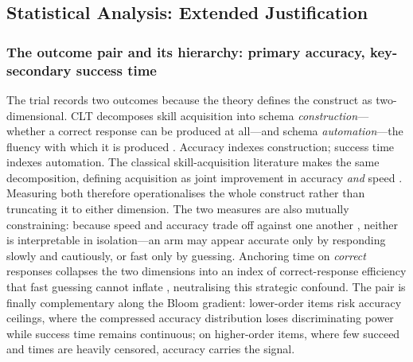 
\subsection{Statistical Analysis: Extended Justification}
\label{app:sap-extended}

\subsubsection{The outcome pair and its hierarchy: primary accuracy, key-secondary success time}
\label{app:coprimary-rationale}
The trial records two outcomes because the theory defines the construct as two-dimensional. CLT decomposes skill acquisition into schema \emph{construction}---whether a correct response can be produced at all---and schema \emph{automation}---the fluency with which it is produced \parencite{sweller1998,kalyuga2003}. Accuracy indexes construction; success time indexes automation. The classical skill-acquisition literature makes the same decomposition, defining acquisition as joint improvement in accuracy \emph{and} speed \parencite{proctor1995,fitts1967}. Measuring both therefore operationalises the whole construct rather than truncating it to either dimension. The two measures are also mutually constraining: because speed and accuracy trade off against one another \parencite{heitz2014}, neither is interpretable in isolation---an arm may appear accurate only by responding slowly and cautiously, or fast only by guessing. Anchoring time on \emph{correct} responses collapses the two dimensions into an index of correct-response efficiency that fast guessing cannot inflate \parencite{vandierendonck2017}, neutralising this strategic confound. The pair is finally complementary along the Bloom gradient: lower-order items risk accuracy ceilings, where the compressed accuracy distribution loses discriminating power while success time remains continuous; on higher-order items, where few succeed and times are heavily censored, accuracy carries the signal.

